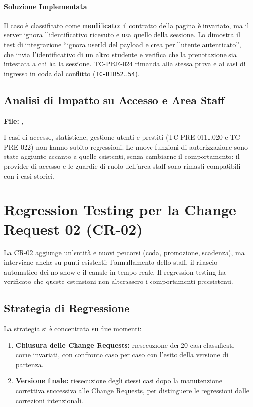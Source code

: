 \documentclass[11pt,a4paper,oneside,openany]{book}
\begin{document}
\paragraph{Soluzione Implementata}
Il caso è classificato come \textbf{modificato}: il contratto della pagina è
invariato, ma il server ignora l'identificativo ricevuto e usa quello della
sessione. Lo dimostra il test di integrazione \enquote{ignora userId del
payload e crea per l'utente autenticato}, che invia l'identificativo di un
altro studente e verifica che la prenotazione sia intestata a chi ha la
sessione. TC-PRE-024 rimanda alla stessa prova e ai casi di ingresso in coda
dal conflitto (\texttt{TC-BIB52}\dots\texttt{54}).

\subsection{Analisi di Impatto su Accesso e Area Staff}

\textbf{File:} ,

I casi di accesso, statistiche, gestione utenti e prestiti (TC-PRE-011\dots020
e TC-PRE-022) non hanno subito regressioni. Le nuove funzioni di
autorizzazione sono state aggiunte accanto a quelle esistenti, senza
cambiarne il comportamento: il provider di accesso e le guardie di ruolo
dell'area staff sono rimasti compatibili con i casi storici.

\section{Regression Testing per la Change Request 02 (CR-02)}

La CR-02 aggiunge un'entità e nuovi percorsi (coda, promozione, scadenza), ma
interviene anche su punti esistenti: l'annullamento dello staff, il rilascio
automatico dei no-show e il canale in tempo reale. Il regression testing ha
verificato che queste estensioni non alterassero i comportamenti preesistenti.

\subsection{Strategia di Regressione}

La strategia si è concentrata su due momenti:
\begin{enumerate}
  \item \textbf{Chiusura delle Change Requests:} riesecuzione dei 20 casi
        classificati come invariati, con confronto caso per caso con l'esito
        della versione di partenza.
  \item \textbf{Versione finale:} riesecuzione degli stessi casi dopo la
        manutenzione correttiva successiva alle Change Requests, per
        distinguere le regressioni dalle correzioni intenzionali.
\end{enumerate}
\end{document}
